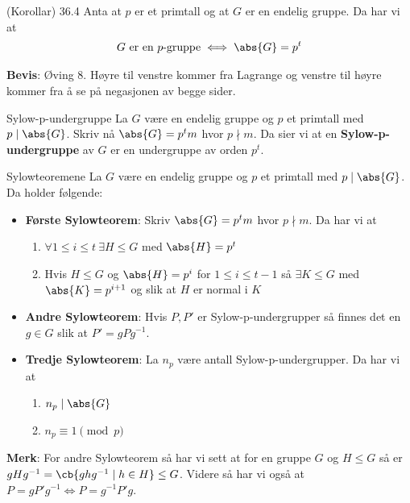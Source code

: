 \begin{theorem*}{(Korollar) 36.4}{}
  Anta at $p$ er et primtall og at $G$ er en endelig gruppe. Da har vi at 
  \begin{align}
    G\text{ er en }p\text{-gruppe} \iff \abs{G}=p^t
  \end{align}
\end{theorem*}
\textbf{Bevis}: Øving 8. Høyre til venstre kommer fra Lagrange og venstre til høyre kommer fra å 
se på negasjonen av begge sider. 

\begin{definition}{Sylow-p-undergruppe}{}
  La $G$ være en endelig gruppe og $p$ et primtall med $p\mid \abs{G}$. Skriv nå $\abs{G}=p^tm$
  hvor $p\nmid m$. Da sier vi at en \textbf{Sylow-p-undergruppe} av $G$ er en undergruppe av
  orden $p^t$. 
\end{definition}

\begin{theorem*}{Sylowteoremene}{}
  La $G$ være en endelig gruppe og $p$ et primtall med $p\mid \abs{G}$. Da holder følgende:

  \begin{itemize}
    \item \textbf{Første Sylowteorem}: Skriv $\abs{G} = p^tm$ hvor $p\nmid m$. Da har vi at
      \begin{enumerate}[label=\alph*)]
        \item $\forall 1\leq i\leq t\ \exists H\leq G$ med $\abs{H}=p^t$
        \item Hvis $H\leq G$ og $\abs{H} = p^i$ for $1\leq i\leq t-1$ så $\exists K \leq G$ med
          $\abs{K}=p^{i+1}$ og slik at $H$ er normal i $K$
      \end{enumerate}
    \item \textbf{Andre Sylowteorem}: Hvis $P, P'$ er Sylow-p-undergrupper så finnes det en 
      $g\in G$ slik at $P'=gPg^{-1}$.
    \item \textbf{Tredje Sylowteorem}: La $n_p$ være antall Sylow-p-undergrupper. Da har vi at
      \begin{enumerate}[label=\alph*)]
        \item $n_p \mid \abs{G}$
        \item $n_p \equiv 1 \pmod{p}$
      \end{enumerate}
  \end{itemize}
\end{theorem*}

\textbf{Merk}: For andre Sylowteorem så har vi sett at for en gruppe $G$ og $H\leq G$ så er 
$gHg^{-1} = \cb{ghg^{-1}\mid h\in H}\leq G$. Videre så har vi også at 
$P=gP'g^{-1}\iff P=g^{-1}P'g$. 

